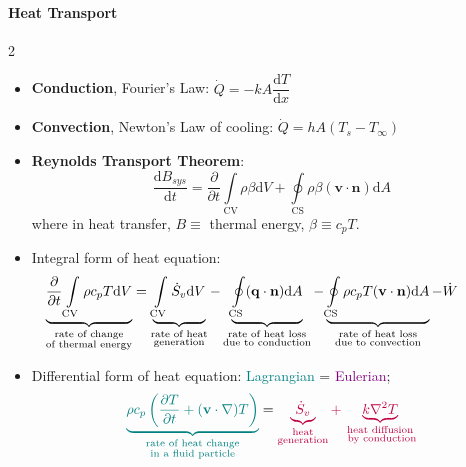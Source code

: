 \documentclass[10pt, a4paper, table]{article}
\begin{document}
\begin{mdframed}\vspace{-.5cm}
\paragraph{Heat Transport}
\begin{multicols}{2}
    \begin{itemize}
    \item \textbf{Conduction}, Fourier's Law: $\displaystyle \dot{Q} = -kA\dfrac{\mathrm{d}T}{\mathrm{d}x}$
    
    \item \textbf{Convection}, Newton's Law of cooling: $\displaystyle \dot{Q} = hA (T_{s} - T_{\infty})$
    
    \item \textbf{Reynolds Transport Theorem}: 
    \[
        \frac{\mathrm{d}B_{sys}}{\mathrm{d}t}=\frac{\partial}{\partial t}\int\limits_{\mathrm{CV}} \rho \beta \mathrm{d}V + \oint\limits_{\mathrm{CS}} \rho \beta(\mathbf{v}\cdot\mathbf{n})\mathrm{d}A   
    \]
    where in heat transfer, $B \equiv$ thermal energy, $\beta \equiv c_p T$.
    
    \item Integral form of heat equation: 
    \[\hspace{-1cm}
        \underbrace{\frac{\partial}{\partial t} \int\limits_{\mathrm{CV}} \rho c_{p} T \mathrm{d}V}_{\substack{\text{rate of change}\\\text{of thermal energy}}} 
        = \underbrace{\int\limits_{\mathrm{CV}} \dot{S}_{v} \mathrm{d}V}_{\substack{\text{rate of heat}\\ \text{generation}}} 
        - \underbrace{\oint\limits_{\mathrm{CS}} (\mathbf{q} \cdot \mathbf{n}) \mathrm{d}A}_{\substack{\text{rate of heat loss}\\\text{due to conduction}}} 
        - \underbrace{\oint\limits_{\mathrm{CS}} \rho c_{p} T (\mathbf{v} \cdot \mathbf{n}) \mathrm{d}A}_{\substack{\text{rate of heat loss}\\ \text{due to convection}}} 
        - \dot{W}
    \]

    \item Differential form of heat equation: \textcolor{teal}{Lagrangian} = \textcolor{purple}{Eulerian}; 
    \[ 
        {\color{teal}
            \underbrace{\rho c_{p} \left( \frac{\partial T}{\partial t} +(\mathbf{v} \cdot \nabla)  T\right)}_{\substack{\text{rate of heat change}\\\text{in a fluid particle}}}
        } 
        = 
        {\color{purple}
            \underbrace{\dot{S}_{v}}_{\substack{\text{heat} \\ \text{generation}}}  + \underbrace{k \nabla^{2} T}_{\substack{\text{heat diffusion} \\ \text{ by conduction}}}
        }
    \]
\end{itemize}
\end{multicols}
\end{mdframed}
\end{document}
